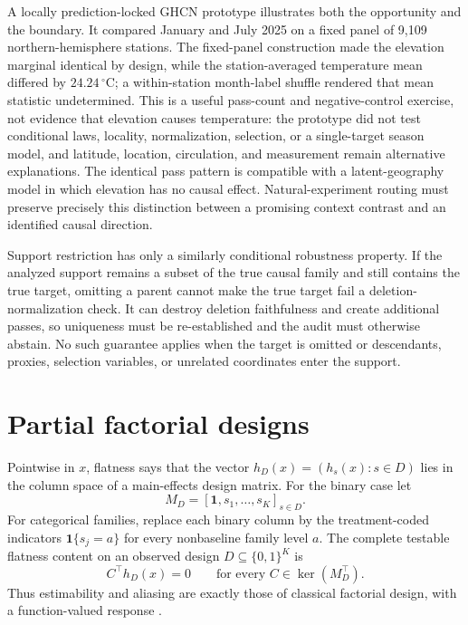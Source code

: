 \documentclass[11pt]{article}
\begin{document}
A locally prediction-locked GHCN prototype illustrates both the opportunity and the
boundary.  It compared January and July 2025 on a fixed panel of 9{,}109
northern-hemisphere stations.  The fixed-panel construction made the elevation
marginal identical by design, while the station-averaged temperature mean
differed by \(24.24\,^{\circ}\mathrm{C}\); a within-station month-label shuffle
rendered that mean statistic undetermined.  This is a useful pass-count and
negative-control exercise, not evidence that elevation causes temperature: the
prototype did not test conditional laws, locality, normalization, selection,
or a single-target season model, and latitude, location, circulation, and
measurement remain alternative explanations.  The identical pass pattern is
compatible with a latent-geography model in which elevation has no causal
effect.  Natural-experiment routing must preserve precisely this distinction
between a promising context contrast and an identified causal direction.

Support restriction has only a similarly conditional robustness property.  If
the analyzed support remains a subset of the true causal family and still
contains the true target, omitting a parent cannot make the true target fail a
deletion-normalization check.  It can destroy deletion faithfulness and create
additional passes, so uniqueness must be re-established and the audit must
otherwise abstain.  No such guarantee applies when the target is omitted or
descendants, proxies, selection variables, or unrelated coordinates enter the
support.

\section{Partial factorial designs}

Pointwise in \(x\), flatness says that the vector \(h_D(x)=(h_s(x):s\in D)\) lies in the column space of a main-effects design matrix.  For the binary case let
\begin{equation}
M_D=[\mathbf 1, s_1,\ldots,s_K]_{s\in D}.
\end{equation}
For categorical families, replace each binary column by the treatment-coded
indicators \(\mathbf1\{s_j=a\}\) for every nonbaseline family level \(a\).
The complete testable flatness content on an observed design \(D\subseteq\{0,1\}^K\) is
\begin{equation}
C^\top h_D(x)=0
\qquad
\text{for every }C\in\ker(M_D^\top).
\label{eq:lack-of-fit-space}
\end{equation}
Thus estimability and aliasing are exactly those of classical factorial design, with a function-valued response \citep{box2005statistics,wu2009experiments}.
\end{document}
